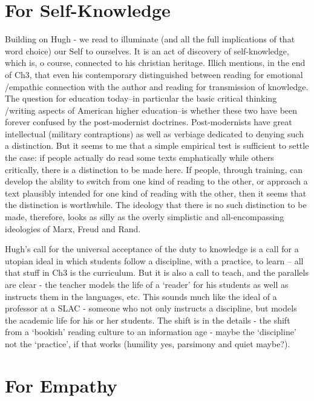 \section{For Self-Knowledge}
\label{forself-knowledge}

Building on Hugh - we read to illuminate (and all the full implications of that word choice) our Self to ourselves. It is an act of discovery of self-knowledge, which is, o course, connected to his christian heritage.
Illich mentions, in the end of Ch3, that even his contemporary distinguished between reading for emotional \slash  empathic connection with the author and reading for transmission of knowledge. The question for education today--in particular the basic critical thinking \slash  writing aspects of American higher education--is whether these two have been forever confused by the post-modernist doctrines. Post-modernists have great intellectual (military contraptions) as well as verbiage dedicated to denying such a distinction. But it seems to me that a simple empirical test is sufficient to settle the case: if people actually do read some texts emphatically while others critically, there is a distinction to be made here. If people, through training, can develop the ability to switch from one kind of reading to the other, or approach a text plausibly intended for one kind of reading with the other, then it seems that the distinction is worthwhile. The ideology that there is no such distinction to be made, therefore, looks as silly as the overly simplistic and all-encompassing ideologies of Marx, Freud and Rand. 

Hugh's call for the universal acceptance of the duty to knowledge is a call for a utopian ideal in which students follow a discipline, with a practice, to learn -- all that stuff in Ch3 is the curriculum. But it is also a call to teach, and the parallels are clear - the teacher models the life of a `reader' for his students as well as instructs them in the languages, etc. This sounds much like the ideal of a professor at a SLAC - someone who not only instructs a discipline, but models the academic life for his or her students.
The shift is in the details - the shift from a `bookish' reading culture to an information age - maybe the `discipline' not the `practice', if that works (humility yes, parsimony and quiet maybe?).

\section{For Empathy}
\label{forempathy}

